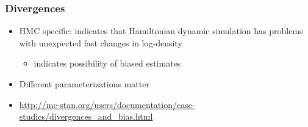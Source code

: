 \documentclass[10pt]{beamer}
\begin{document}
\begin{frame}

\frametitle{Divergences}

  \begin{itemize}
  \item HMC specific: indicates that Hamiltonian dynamic simulation
    has problems with unexpected fast changes in log-density
    \begin{itemize}
    \item indicates possibility of biased estimates
    \end{itemize}
  \item Different parameterizations matter
  \item {\small \url{http://mc-stan.org/users/documentation/case-studies/divergences_and_bias.html}}

\end{itemize}
\end{frame}
\end{document}
